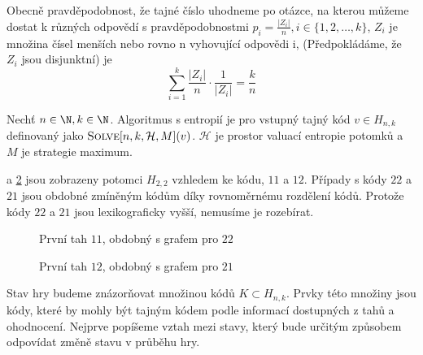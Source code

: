Obecně pravděpodobnost, že tajné číslo uhodneme po otázce, na kterou můžeme dostat k různých odpovědí s pravděpodobnostmi $p_i = \frac{|Z_i|}{n}, i \in \{1, 2, \dots, k\}$, $Z_i$ je množina čísel menších nebo rovno n vyhovující odpovědi i, (Předpokládáme, že $Z_i$ jsou disjunktní) je 
\[\sum_{i = 1}^k \frac{|Z_i|}{n} \cdot \frac{1}{|Z_i|} = \frac{k}{n}\]

Nechť $n\in \N, k\in \N$. Algoritmus s entropií je pro vstupný tajný kód $v\in H_{n,k}$ definovaný jako $\text{\textsc{Solve}}[n, k, \mathcal{H}, M](v)$. $\mathcal{H}$ je prostor valuací entropie potomků a $M$ je strategie maximum. 


a \ref{fig22prvnitah12} jsou zobrazeny potomci $H_{2,2}$ vzhledem ke kódu, $11$ a $12$. Případy s kódy $22$ a $21$ jsou obdobné zmíněným kódům díky rovnoměrnému rozdělení kódů. Protože kódy $22$ a $21$ jsou lexikograficky vyšší, nemusíme je rozebírat. 
\begin{figure}[h!]
    \centering
    \caption{První tah $11$, obdobný s grafem pro $22$}
    \label{fig22prvnitah11}
    \end{figure}
\begin{figure}[h!]
    \centering
    \caption{První tah $12$, obdobný s grafem pro $21$}
    \label{fig22prvnitah12}
\end{figure}



Stav hry budeme znázorňovat množinou kódů $K \subset H_{n,k}$. Prvky této množiny jsou kódy, které by mohly být tajným kódem podle informací dostupných z tahů a ohodnocení. Nejprve popíšeme vztah mezi stavy, který bude určitým způsobem odpovídat změně stavu v průběhu hry. 

